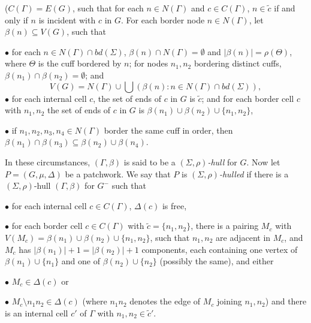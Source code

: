 \noindent ($C(\Gamma) = E(G)$, such that for each $n \in N(\Gamma)$ and $c \in C(\Gamma)$, $n \in \tilde{c}$ if and only if $n$ is incident with $c$ in $G$. For each border node $n \in N(\Gamma)$, let $\beta(n) \subseteq V(G)$, such that

\hspace*{12pt}$\bullet$ for each $n \in N(\Gamma) \cap bd(\Sigma)$, $\beta(n) \cap N(\Gamma) = \emptyset$ and $|\beta(n)| = \rho(\Theta)$, where $\Theta$ is the cuff bordered by $n$; for nodes $n_1, n_2$ bordering distinct cuffs, $\beta(n_1) \cap \beta(n_2) = \emptyset$; and
\begin{equation*}
V(G) = N(\Gamma) \cup \bigcup (\beta(n) : n \in N(\Gamma) \cap bd(\Sigma)),
\end{equation*}
\hspace*{12pt}$\bullet$ for each internal cell $c$, the set of ends of $c$ in $G$ is $\tilde{c}$; and for each border cell $c$ with $n_1, n_2$ the set of ends of $c$ in $G$ is $\beta(n_1) \cup \beta(n_2) \cup \{n_1, n_2\}$,

\hspace*{12pt}$\bullet$ if $n_1, n_2, n_3, n_4 \in N(\Gamma)$ border the same cuff in order, then $\beta(n_1) \cap \beta(n_3) \subseteq \beta(n_2) \cup \beta(n_4)$.

In these circumstances, $(\Gamma, \beta)$ is said to be a \textit{$(\Sigma, \rho)$-hull} for $G$. Now let $P = (G, \mu, \Delta)$ be a patchwork. We say that $P$ is \textit{$(\Sigma, \rho)$-hulled} if there is a $(\Sigma, \rho)$-hull $(\Gamma, \beta)$ for $G^-$ such that

\hspace*{12pt}$\bullet$ for each internal cell $c \in C(\Gamma)$, $\Delta(c)$ is free,

\hspace*{12pt}$\bullet$ for each border cell $c \in C(\Gamma)$ with $\tilde{c} = \{n_1, n_2\}$, there is a pairing $M_c$ with $V(M_c) = \beta(n_1) \cup \beta(n_2) \cup \{n_1, n_2\}$, such that $n_1, n_2$ are adjacent in $M_c$, and $M_c$ has $|\beta(n_1)| + 1 = |\beta(n_2)| + 1$ components, each containing one vertex of $\beta(n_1) \cup \{n_1\}$ and one of $\beta(n_2) \cup \{n_2\}$ (possibly the same), and either

\hspace*{12pt}$\bullet$ $M_c \in \Delta(c)$ or

\hspace*{12pt}$\bullet$ $M_c \setminus n_1n_2 \in \Delta(c)$ (where $n_1n_2$ denotes the edge of $M_c$ joining $n_1, n_2$) and there is an internal cell $c'$ of $\Gamma$ with $n_1, n_2 \in \tilde{c}'$.

